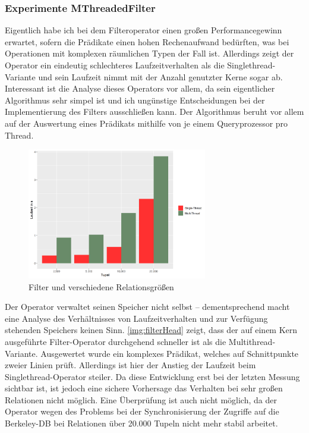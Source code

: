 \documentclass[a4paper,12pt,twoside]{article}
\begin{document}
{\subsubsection{Experimente MThreadedFilter}
\label{entw:filter}

Eigentlich habe ich bei dem Filteroperator einen großen Performancegewinn erwartet, sofern die Prädikate einen hohen Rechenaufwand bedürften, was bei Operationen mit komplexen räumlichen Typen der Fall ist. Allerdings zeigt der Operator ein eindeutig schlechteres Laufzeitverhalten als die Singlethread-Variante und sein Laufzeit nimmt mit der Anzahl genutzter Kerne sogar ab. Interessant ist die Analyse dieses Operators vor allem, da sein eigentlicher Algorithmus sehr simpel ist und ich ungünstige Entscheidungen bei der Implementierung des Filters ausschließen kann. Der Algorithmus beruht vor allem auf der Auswertung eines Prädikats mithilfe von je einem Queryprozessor pro Thread.
  
\begin{figure}
	\centering
	\includegraphics[width=0.70\textwidth]{Bilder/filter_head.png}
	\caption{Filter und verschiedene Relationsgrößen}
	\label{img:filterHead}
\end{figure}

Der Operator verwaltet seinen Speicher nicht selbst -- dementsprechend macht eine Analyse des Verhältnisses von Laufzeitverhalten und zur Verfügung stehenden Speichers keinen Sinn. \autoref{img:filterHead} zeigt, dass der auf einem Kern ausgeführte Filter-Operator durchgehend schneller ist als die Multithread-Variante. Ausgewertet wurde ein komplexes Prädikat, welches auf Schnittpunkte zweier Linien prüft. Allerdings ist hier der Anstieg der Laufzeit beim Singlethread-Operator steiler. Da diese Entwicklung erst bei der letzten Messung sichtbar ist, ist jedoch eine sichere Vorhersage das Verhalten bei sehr großen Relationen nicht möglich. Eine Überprüfung ist auch nicht möglich, da der Operator wegen des Problems bei der Synchronisierung der Zugriffe auf die Berkeley-DB bei Relationen über 20.000 Tupeln nicht mehr stabil arbeitet. 

}
\end{document}
